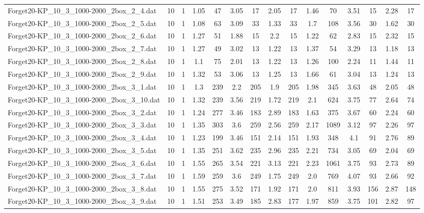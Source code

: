 \begin{table}[!ht]
{\begin{tabular}{lcccccccccccccc}
Forget20-KP\_10\_3\_1000-2000\_2box\_2\_4.dat & 10 & 1 & 1.05 & 47 & 3.05 & 17 & 2.05 & 17 & 1.46 & 70 & 3.51 & 15 & 2.28 & 17 \\
Forget20-KP\_10\_3\_1000-2000\_2box\_2\_5.dat & 10 & 1 & 1.08 & 63 & 3.09 & 33 & 1.33 & 33 & 1.7 & 108 & 3.56 & 30 & 1.62 & 30 \\
Forget20-KP\_10\_3\_1000-2000\_2box\_2\_6.dat & 10 & 1 & 1.27 & 51 & 1.88 & 15 & 2.2 & 15 & 1.22 & 62 & 2.83 & 15 & 2.32 & 15 \\
Forget20-KP\_10\_3\_1000-2000\_2box\_2\_7.dat & 10 & 1 & 1.27 & 49 & 3.02 & 13 & 1.22 & 13 & 1.37 & 54 & 3.29 & 13 & 1.18 & 13 \\
Forget20-KP\_10\_3\_1000-2000\_2box\_2\_8.dat & 10 & 1 & 1.1 & 75 & 2.01 & 13 & 1.22 & 13 & 1.26 & 100 & 2.24 & 11 & 1.44 & 11 \\
Forget20-KP\_10\_3\_1000-2000\_2box\_2\_9.dat & 10 & 1 & 1.32 & 53 & 3.06 & 13 & 1.25 & 13 & 1.66 & 61 & 3.04 & 13 & 1.24 & 13 \\
Forget20-KP\_10\_3\_1000-2000\_2box\_3\_1.dat & 10 & 1 & 1.3 & 239 & 2.2 & 205 & 1.9 & 205 & 1.98 & 345 & 3.63 & 48 & 2.05 & 48 \\
Forget20-KP\_10\_3\_1000-2000\_2box\_3\_10.dat & 10 & 1 & 1.32 & 239 & 3.56 & 219 & 1.72 & 219 & 2.1 & 624 & 3.75 & 77 & 2.64 & 74 \\
Forget20-KP\_10\_3\_1000-2000\_2box\_3\_2.dat & 10 & 1 & 1.24 & 277 & 3.46 & 183 & 2.89 & 183 & 1.63 & 375 & 3.67 & 60 & 2.24 & 60 \\
Forget20-KP\_10\_3\_1000-2000\_2box\_3\_3.dat & 10 & 1 & 1.35 & 303 & 3.6 & 259 & 2.56 & 259 & 2.17 & 1089 & 3.12 & 97 & 2.26 & 97 \\
Forget20-KP\_10\_3\_1000-2000\_2box\_3\_4.dat & 10 & 1 & 1.23 & 199 & 3.46 & 151 & 2.14 & 151 & 1.93 & 348 & 4.1 & 91 & 2.76 & 89 \\
Forget20-KP\_10\_3\_1000-2000\_2box\_3\_5.dat & 10 & 1 & 1.35 & 251 & 3.62 & 235 & 2.96 & 235 & 2.21 & 734 & 3.05 & 69 & 2.04 & 69 \\
Forget20-KP\_10\_3\_1000-2000\_2box\_3\_6.dat & 10 & 1 & 1.55 & 265 & 3.54 & 221 & 3.13 & 221 & 2.23 & 1061 & 3.75 & 93 & 2.73 & 89 \\
Forget20-KP\_10\_3\_1000-2000\_2box\_3\_7.dat & 10 & 1 & 1.59 & 259 & 3.6 & 249 & 1.75 & 249 & 2.0 & 769 & 4.07 & 93 & 2.66 & 92 \\
Forget20-KP\_10\_3\_1000-2000\_2box\_3\_8.dat & 10 & 1 & 1.55 & 275 & 3.52 & 171 & 1.92 & 171 & 2.0 & 811 & 3.93 & 156 & 2.87 & 148 \\
Forget20-KP\_10\_3\_1000-2000\_2box\_3\_9.dat & 10 & 1 & 1.51 & 253 & 3.49 & 185 & 2.83 & 177 & 1.97 & 859 & 3.75 & 101 & 2.82 & 97 \\

\end{tabular}}
\end{table}
